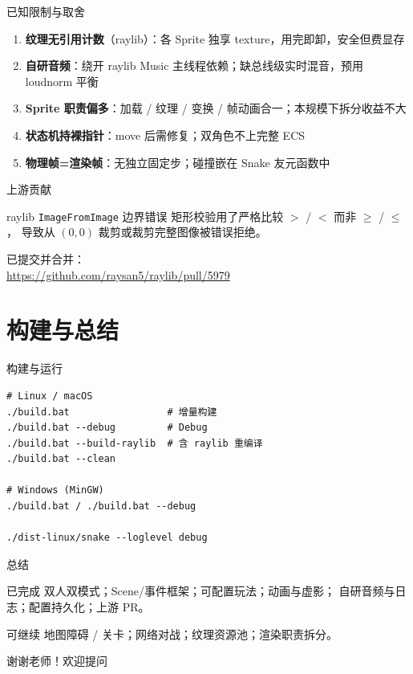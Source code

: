 \documentclass[aspectratio=169,13pt]{beamer}
\begin{document}
\begin{frame}{已知限制与取舍}
  \footnotesize
  \begin{enumerate}
    \item \textbf{纹理无引用计数}（raylib）：各 Sprite 独享 texture，用完即卸，安全但费显存
    \item \textbf{自研音频}：绕开 raylib Music 主线程依赖；缺总线级实时混音，预用 loudnorm 平衡
    \item \textbf{Sprite 职责偏多}：加载 / 纹理 / 变换 / 帧动画合一；本规模下拆分收益不大
    \item \textbf{状态机持裸指针}：move 后需修复；双角色不上完整 ECS
    \item \textbf{物理帧=渲染帧}：无独立固定步；碰撞嵌在 Snake 友元函数中
  \end{enumerate}
\end{frame}

\begin{frame}{上游贡献}
  \begin{block}{raylib \texttt{ImageFromImage} 边界错误}
    矩形校验用了严格比较 $>$ / $<$ 而非 $\ge$ / $\le$，
    导致从 $(0,0)$ 裁剪或裁剪完整图像被错误拒绝。
  \end{block}

  \vspace{0.5em}
  已提交并合并：\\
  \url{https://github.com/raysan5/raylib/pull/5979}
\end{frame}

\section{构建与总结}

\begin{frame}[fragile]{构建与运行}
\begin{verbatim}
# Linux / macOS
./build.bat                 # 增量构建
./build.bat --debug         # Debug
./build.bat --build-raylib  # 含 raylib 重编译
./build.bat --clean

# Windows (MinGW)
./build.bat / ./build.bat --debug

./dist-linux/snake --loglevel debug
\end{verbatim}
\end{frame}

\begin{frame}{总结}
  \begin{block}{已完成}
    双人双模式；Scene/事件框架；可配置玩法；动画与虚影；
    自研音频与日志；配置持久化；上游 PR。
  \end{block}

  \vspace{0.4em}
  \begin{block}{可继续}
    地图障碍 / 关卡；网络对战；纹理资源池；渲染职责拆分。
  \end{block}

  \vspace{0.8em}
  \begin{center}
    {\Large 谢谢老师！欢迎提问}
  \end{center}
\end{frame}
\end{document}
